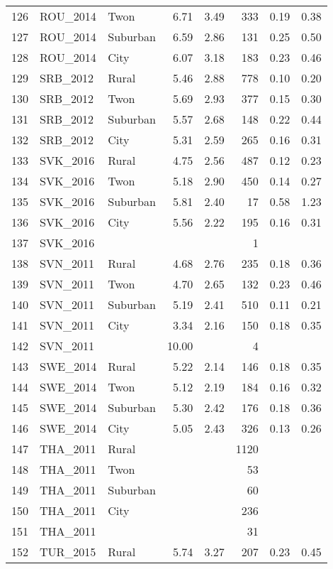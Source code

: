 \documentclass[12pt, titlepage]{article}
\begin{document}
\begin{table}[ht]
\begin{tabular}{rllrrrrr}
		126 & ROU\_2014 & Twon & 6.71 & 3.49 & 333 & 0.19 & 0.38 \\ 
		127 & ROU\_2014 & Suburban & 6.59 & 2.86 & 131 & 0.25 & 0.50 \\ 
		128 & ROU\_2014 & City & 6.07 & 3.18 & 183 & 0.23 & 0.46 \\ 
		129 & SRB\_2012 & Rural & 5.46 & 2.88 & 778 & 0.10 & 0.20 \\ 
		130 & SRB\_2012 & Twon & 5.69 & 2.93 & 377 & 0.15 & 0.30 \\ 
		131 & SRB\_2012 & Suburban & 5.57 & 2.68 & 148 & 0.22 & 0.44 \\ 
		132 & SRB\_2012 & City & 5.31 & 2.59 & 265 & 0.16 & 0.31 \\ 
		133 & SVK\_2016 & Rural & 4.75 & 2.56 & 487 & 0.12 & 0.23 \\ 
		134 & SVK\_2016 & Twon & 5.18 & 2.90 & 450 & 0.14 & 0.27 \\ 
		135 & SVK\_2016 & Suburban & 5.81 & 2.40 &  17 & 0.58 & 1.23 \\ 
		136 & SVK\_2016 & City & 5.56 & 2.22 & 195 & 0.16 & 0.31 \\ 
		137 & SVK\_2016 &  &  &  &   1 &  &  \\ 
		138 & SVN\_2011 & Rural & 4.68 & 2.76 & 235 & 0.18 & 0.36 \\ 
		139 & SVN\_2011 & Twon & 4.70 & 2.65 & 132 & 0.23 & 0.46 \\ 
		140 & SVN\_2011 & Suburban & 5.19 & 2.41 & 510 & 0.11 & 0.21 \\ 
		141 & SVN\_2011 & City & 3.34 & 2.16 & 150 & 0.18 & 0.35 \\ 
		142 & SVN\_2011 &  & 10.00 &  &   4 &  &  \\ 
		143 & SWE\_2014 & Rural & 5.22 & 2.14 & 146 & 0.18 & 0.35 \\ 
		144 & SWE\_2014 & Twon & 5.12 & 2.19 & 184 & 0.16 & 0.32 \\ 
		145 & SWE\_2014 & Suburban & 5.30 & 2.42 & 176 & 0.18 & 0.36 \\ 
		146 & SWE\_2014 & City & 5.05 & 2.43 & 326 & 0.13 & 0.26 \\ 
		147 & THA\_2011 & Rural &  &  & 1120 &  &  \\ 
		148 & THA\_2011 & Twon &  &  &  53 &  &  \\ 
		149 & THA\_2011 & Suburban &  &  &  60 &  &  \\ 
		150 & THA\_2011 & City &  &  & 236 &  &  \\ 
		151 & THA\_2011 &  &  &  &  31 &  &  \\ 
		152 & TUR\_2015 & Rural & 5.74 & 3.27 & 207 & 0.23 & 0.45 \\ 

\end{tabular}
\end{table}
\end{document}
